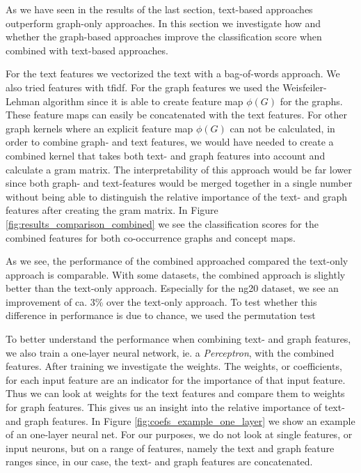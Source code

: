 
As we have seen in the results of the last section, text-based approaches outperform graph-only approaches.
In this section we investigate how and whether the graph-based approaches improve the classification score when combined with text-based approaches.

For the text features we vectorized the text with a bag-of-words approach. We also tried features with tfidf.
For the graph features we used the Weisfeiler-Lehman algorithm since it is able to create feature map $\phi(G)$ for the graphs.
These feature maps can easily be concatenated with the text features.
For other graph kernels where an explicit feature map $\phi(G)$ can not be calculated, in order to combine graph- and text features, we would have needed to create a combined kernel that takes both text- and graph features into account and calculate a gram matrix.
The interpretability of this approach would be far lower since both graph- and text-features would be merged together in a single number without being able to distinguish the relative importance of the text- and graph features after creating the gram matrix.
In Figure \ref{fig:results_comparison_combined} we see the classification scores for the combined features for both co-occurrence graphs and concept maps.

As we see, the performance of the combined approached compared the text-only approach is comparable.
With some datasets, the combined approach is slightly better than the text-only approach. Especially for the ng20 dataset, we see an improvement of ca. 3\% over the text-only approach.
To test whether this difference in performance is due to chance, we used the permutation test

To better understand the performance when combining text- and graph features, we also train a one-layer neural network, ie. a \textit{Perceptron}, with the combined features. After training we investigate the weights.
The weights, or coefficients, for each input feature are an indicator for the importance of that input feature.
Thus we can look at weights for the text features and compare them to weights for graph features.
This gives us an insight into the relative importance of text- and graph features.
In Figure \ref{fig:coefs_example_one_layer} we show an example of an one-layer neural net.
For our purposes, we do not look at single features, or input neurons, but on a range of features, namely the text and graph feature ranges since, in our case, the text- and graph features are concatenated.

